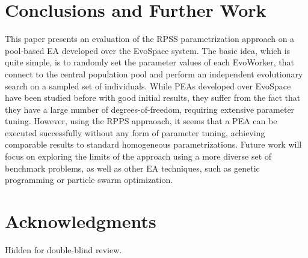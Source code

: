\documentclass{sig-alternate}
\begin{document}



\section{Conclusions and Further Work}
\label{sec:conclusions}
This paper presents an evaluation of the RPSS parametrization approach on a pool-based EA developed over the EvoSpace system.
The basic idea, which is quite simple, is to randomly set the parameter values of each EvoWorker, that connect to the central population pool
and perform an independent evolutionary search on a sampled set of individuals.
While PEAs developed over EvoSpace have been studied before with good initial results, they suffer from the fact that they have a large number of degrees-of-freedom,
requiring extensive parameter tuning.
However, using the RPPS appraoach, it seems that a PEA can be executed successfully  without any form of parameter tuning, achieving comparable results to
standard homogeneous parametrizations.
Future work will focus on exploring the limits of the approach using a more diverse set of benchmark problems, as well as other EA techniques,
such as genetic programming or particle swarm optimization.



\section{Acknowledgments}

Hidden for double-blind review. 

%

\begin{footnotesize}

\end{footnotesize}
\end{document}
